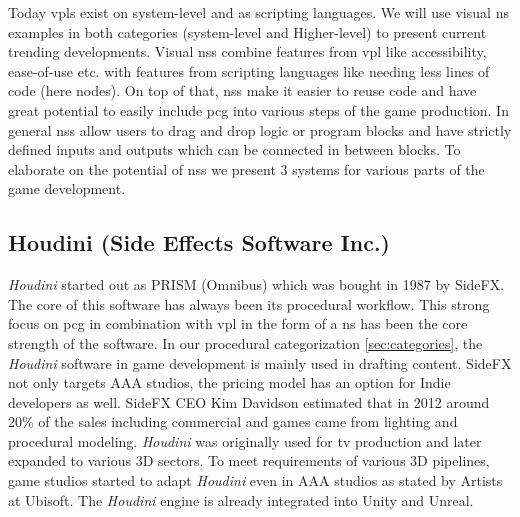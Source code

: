 \documentclass[10pt,a4paper]{article}
\begin{document}
\begin{multicols}{2}
Today \gls{vpl}s exist on system-level and as scripting languages. We will use visual \gls{ns} examples in both categories (system-level and Higher-level) to present current trending developments. Visual \gls{ns}s combine features from \gls{vpl} like accessibility, ease-of-use etc. with features from scripting languages like needing less lines of code (here nodes). On top of that, \gls{ns}s make it easier to reuse code and have great potential to easily include \gls{pcg} into various steps of the game production. In general \gls{ns}s allow users to drag and drop logic or program blocks and have strictly defined inputs and outputs which can be connected in between blocks. To elaborate on the potential of \gls{ns}s we present 3 systems for various parts of the game development.\end{multicols}
\subsection{Houdini (Side Effects Software Inc.)}
\begin{multicols}{2}
\textit{Houdini} started out as PRISM (Omnibus) which was bought in 1987 by SideFX. The core of this software has always been its procedural workflow. This strong focus on \gls{pcg} in combination with \gls{vpl} in the form of a \gls{ns} has been the core strength of the software\cite{Seymour2012}. In our procedural categorization \autoref{sec:categories}, the \textit{Houdini} software in game development is mainly used in drafting content. SideFX not only targets AAA studios, the pricing model has an option for Indie developers as well. SideFX CEO Kim Davidson estimated that in 2012 around 20\% of the sales including commercial and games came from lighting and procedural modeling. \textit{Houdini} was originally used for tv production and later expanded to various 3D sectors. To meet requirements of various 3D pipelines, game studios started to adapt \textit{Houdini} even in AAA studios as stated by Artists at Ubisoft\cite{Carrier2018}. The \textit{Houdini} engine is already integrated into Unity and Unreal\cite{SideFXGamesupport}.\end{multicols}
\end{document}
